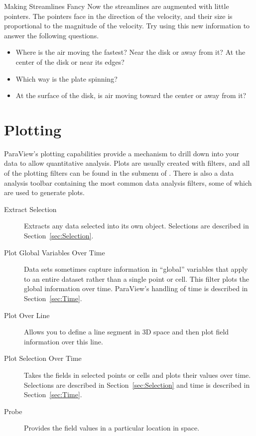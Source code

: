 \begin{exercise}{Making Streamlines Fancy}
  Now the streamlines are augmented with little pointers.  The pointers
  face in the direction of the velocity, and their size is proportional to
  the magnitude of the velocity.  Try using this new information to answer
  the following questions.

  \begin{itemize}
  \item Where is the air moving the fastest?  Near the disk or away from it?
    At the center of the disk or near its edges?
  \item Which way is the plate spinning?
  \item At the surface of the disk, is air moving toward the center or away
    from it?
  \end{itemize}
\end{exercise}


\section{Plotting}
\label{sec:Plotting}

ParaView's plotting capabilities provide a mechanism to drill down into
your data to allow quantitative analysis.  Plots are usually created with
filters, and all of the plotting filters can be found in the  submenu of .  There is also a data analysis
toolbar containing the most common data analysis filters, some of which are
used to generate plots.


\begin{description}
\item[\extractSelection Extract Selection] Extracts any data selected into
  its own object.  Selections are described in Section~\ref{sec:Selection}.
\item[\plotGlobal Plot Global Variables Over Time] Data sets sometimes
  capture information in ``global'' variables that apply to an entire
  dataset rather than a single point or cell.  This filter plots the global
  information over time.  ParaView's handling of time is described in
  Section~\ref{sec:Time}.
\item[\plotOverLine Plot Over Line] Allows you to define a line segment
  in 3D space and then plot field information over this line.
\item[\plotSelectionOverTime Plot Selection Over Time] Takes the fields in
  selected points or cells and plots their values over time.  Selections
  are described in Section~\ref{sec:Selection} and time is described in
  Section~\ref{sec:Time}.
\item[\probe Probe] Provides the field values in a particular location in
  space.
\end{description}

